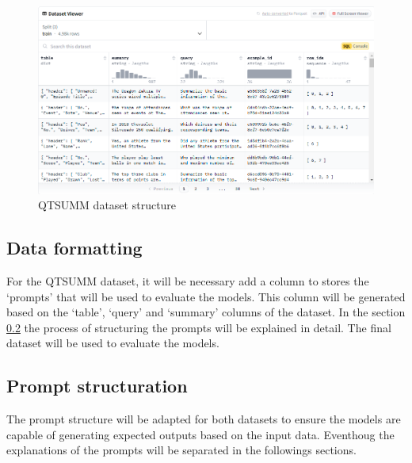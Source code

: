 \begin{figure}[H]
    \centering
    \includegraphics[width=12cm]{images/qsumm_structure.png} 
    \caption{QTSUMM dataset structure \cite{zhao2023qtsummqueryfocusedsummarizationtabular}}
    \label{fig:qsumm-structure}
\end{figure}

\subsection{Data formatting}
For the QTSUMM dataset, it will be necessary add a column to stores the `prompts' that will be used to evaluate the models. This column will be generated based on the `table', `query' and `summary' columns of the dataset. In the section \ref{subsubsec:prompt-structuration} the process of structuring the prompts will be explained in detail. The final dataset will be used to evaluate the models. 

\subsection{Prompt structuration}\label{subsubsec:prompt-structuration}
The prompt structure will be adapted for both datasets to ensure the models are capable of generating expected outputs based on the input data. Eventhoug the explanations of the prompts will be separated in the followings sections.

